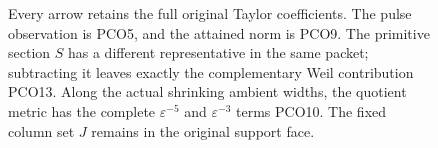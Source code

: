\begin{figure}[ht]
\centering
{}
\caption{Every arrow retains the full original Taylor coefficients.
The pulse observation is PCO5, and the attained norm is PCO9.
The primitive section $S$ has a different representative in the
same packet; subtracting it leaves exactly the complementary
Weil contribution PCO13. Along the actual shrinking ambient
widths, the quotient metric has the complete
$\varepsilon^{-5}$ and $\varepsilon^{-3}$ terms PCO10.
The fixed column set $J$ remains in the original support face.}
\end{figure}
